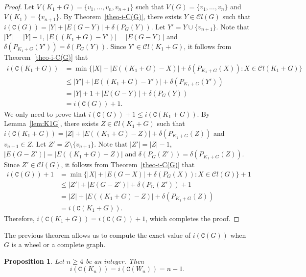 \documentclass[12pt]{article}
\newtheorem{proposition}[remark]{Proposition}
\begin{document}
\begin{proof}
Let $V(K_1+G)=\{v_1,\ldots,v_n,v_{n+1}\}$ such that $V(G)=\{v_1,\ldots,v_n\}$ and $V(K_1) = \{v_{n+1}\}$. 
By Theorem~\ref{theo-i-C(G)}, there exists $Y\in\mathcal{C}l(G)$ such that $i (\mathtt{C}(G)) = |Y|+|E(G-Y)|+\delta(P_{G}(Y))$. Let $Y' = Y\cup \{v_{n+1}\}$. Note that $|Y'| = |Y| + 1$, $|E((K_1+G)-Y')| = |E(G-Y)|$ and $\delta(P_{K_1 +G}(Y')) = \delta(P_{G}(Y))$. Since $Y' \in \mathcal{C}l (K_1 +G)$, it follows from Theorem~\ref{theo-i-C(G)} that
\begin{equation*}
\begin{split}
i(\mathtt{C}(K_1+G)) 
&=\min\{|X|+|E((K_1+G)-X)|+\delta(P_{K_1 + G}(X)): X \in\mathcal{C}l(K_1+G)\} \\[4pt]
&\leq |Y'|+|E((K_1+G)-Y')|+\delta(P_{K_1 + G}(Y')) \\[4pt]
&= |Y|+1+|E(G-Y)|+\delta(P_{G}(Y))\\[4pt]
& = i(\mathtt{C}(G))+1.
\end{split}
\end{equation*}
We only need to prove that $i(\mathtt{C}(G)) + 1\leq i(\mathtt{C}(K_1+ G))$. By Lemma~\ref{lem:K1G}, there exists $Z \in \mathcal{C}l(K_1+G)$ such that $i(\mathtt{C}(K_1+G))  = |Z| + |E((K_1+G) - Z)| + \delta(P_{K_1+G}(Z))$ and $v_{n+1}\in Z$. Let $Z' = Z\setminus \{v_{n+1}\}$. 
Note that $|Z'|=|Z|-1$, $|E(G-Z')| = |E((K_1+ G) - Z)|$ and $\delta(P_{G}(Z'))=\delta(P_{K_1 + G}(Z))$. Since $Z' \in \mathcal{C}l(G)$, it follows from Theorem~\ref{theo-i-C(G)} that
\begin{equation*}
\begin{split}
i(\mathtt{C}(G))+1 
&=\min\{|X|+|E(G-X)|+\delta(P_{G}(X)): X \in\mathcal{C}l(G)\}+1 \\[4pt]
&\leq |Z'|+|E(G-Z')|+\delta(P_{G}(Z'))+1 \\[4pt]
&= |Z|+|E((K_1+G)-Z)|+\delta(P_{K_1+ G}(Z))\\[4pt]
& = i(\mathtt{C}(K_1+G)).
\end{split}
\end{equation*}
Therefore, $i(\mathtt{C}(K_1+ G))=i(\mathtt{C}(G)) + 1$, which completes the proof.
\end{proof}
	
\noindent
The previous theorem allows us to compute the exact value of $i(\mathtt{C}(G))$ when $G$ is a wheel or a complete graph.

\begin{proposition}
Let $n\geq 4$ be an integer. Then
$$i(\mathtt{C}(K_n)) =i(\mathtt{C}(W_n))= n-1.$$
\end{proposition}
\end{document}
